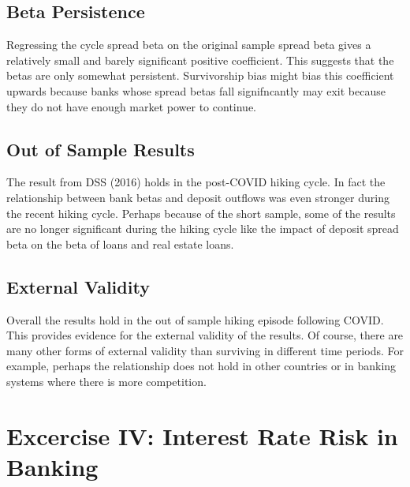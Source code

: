 \documentclass[11pt]{article}
\begin{document}
\subsection{Beta Persistence}

Regressing the cycle spread beta on the original sample spread beta gives a relatively small and barely significant positive coefficient. This suggests that the betas are only somewhat persistent. Survivorship bias might bias this coefficient upwards because banks whose spread betas fall signifncantly may exit because they do not have enough market power to continue.

\begin{table}[H]
    \centering
    \caption{Beta persistence}
    \label{tab:persistence}
    
\end{table}

\subsection{Out of Sample Results}

The result from DSS (2016) holds in the post-COVID hiking cycle. In fact the relationship between bank betas and deposit outflows was even stronger during the recent hiking cycle. Perhaps because of the short sample, some of the results are no longer significant during the hiking cycle like the impact of deposit spread beta on the beta of loans and real estate loans.


\begin{table}[H]
    \centering
    \caption{Out of sample results: All banks}
    \label{tab:table_ix_panel_a}
    \resizebox{\textwidth}{!}{%
    }
\end{table}

\subsection{External Validity}

Overall the results hold in the out of sample hiking episode following COVID. This provides evidence for the external validity of the results. Of course, there are many other forms of external validity than surviving in different time periods. For example, perhaps the relationship does not hold in other countries or in banking systems where there is more competition.

\section{Excercise IV: Interest Rate Risk in Banking}
\end{document}
